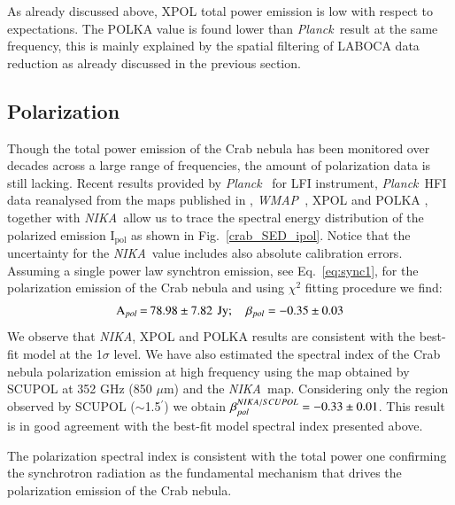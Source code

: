 \documentclass[twocolumn,traditabstract]{aa}
\def\NIKA{\textit{NIKA}}
\def\Planck{\textit{Planck}}
\def\WMAP{\textit{WMAP}}
\begin{document}
As already discussed above, XPOL total power emission is low with respect to expectations.
The POLKA value is found lower than \Planck\ result at the same frequency, this is mainly explained by the spatial filtering of LABOCA data reduction as already discussed in the previous section.
  


\subsection{Polarization}
Though the total power emission of the Crab nebula has been monitored over decades across a large range of frequencies, the amount of polarization data is still lacking.
Recent results provided by
\Planck\ \citep{2015arXiv150702058P} for LFI instrument, \Planck\ HFI data reanalysed from the maps published in \cite{refId0}, \WMAP\ \citep{2011ApJS..192...19W},
XPOL \citep{aumont2010} and POLKA \citep{2014PASP..126.1027W}, together with \NIKA\ allow us to trace the spectral energy distribution of the polarized emission I$_{\textrm{pol}}$ as shown in Fig.~\ref{crab_SED_ipol}.  
Notice that the uncertainty for the \NIKA\ value includes also absolute calibration errors.  
Assuming a single power law synchtron emission, see Eq.~\ref{eq:sync1}, for the polarization emission of the Crab nebula and using $\chi^2$ fitting procedure we find:
$$
\setlength\arraycolsep{0.1em}
 \begin{array}{rclcl}
  \textrm{A$_{pol}$}&=& 78.98\pm7.82 & & \textrm{Jy}; \quad \textrm{$\beta_{pol}$} = - 0.35\pm0.03\\
 \end{array}
 $$
We observe that \NIKA, XPOL and POLKA results are consistent with the best-fit model at the 1$\sigma$ level.
We have also estimated the spectral index of the Crab nebula polarization
emission at high frequency using the map obtained by SCUPOL \citep{scubapol} at 352 GHz (850
$\mu$m) and the \NIKA\ map. Considering only the region observed by SCUPOL ($\sim$1.5$^{\prime}$) we
obtain $\beta_{pol}^{\small NIKA/SCUPOL} = -0.33 \pm 0.01$.
This result is in good agreement with the best-fit model spectral index presented above.

The polarization spectral index is consistent with the total power one confirming the synchrotron radiation as the fundamental mechanism that drives the polarization emission of the Crab nebula.
\end{document}
